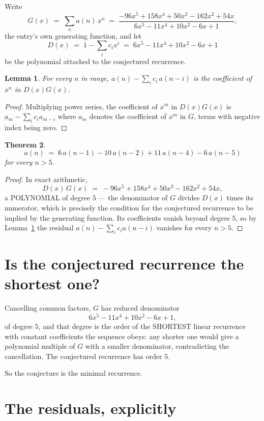 \documentclass[11pt,a4paper]{article}
\theoremstyle{plain}
\newtheorem{theorem}{Theorem}
\newtheorem{lemma}[theorem]{Lemma}
\theoremstyle{definition}
\begin{document}
Write
\[
G(x)\;=\;\sum_{n}a(n)\,x^{n}\;=\;\frac{- 96 x^{5} + 158 x^{4} + 50 x^{3} - 162 x^{2} + 54 x}{6 x^{5} - 11 x^{4} + 10 x^{2} - 6 x + 1},
\]
the entry's own generating function, and let
\[
D(x)\;=\;1-\sum_i c_i x^{i}\;=\;6 x^{5} - 11 x^{4} + 10 x^{2} - 6 x + 1
\]
be the polynomial attached to the conjectured recurrence.

\begin{lemma}\label{lem:key}
For every $n$ in range, $a(n)-\sum_i c_i\,a(n-i)$ is the coefficient of $x^{n}$ in
$D(x)G(x)$.
\end{lemma}

\begin{proof}
Multiplying power series, the coefficient of $x^{m}$ in $D(x)G(x)$ is
$a_m-\sum_i c_i a_{m-i}$ where $a_m$ denotes the coefficient of $x^{m}$ in $G$, terms with
negative index being zero.
\end{proof}

\begin{theorem}
\[
a(n)\;=\;6\,a(n-1) - 10\,a(n-2) + 11\,a(n-4) - 6\,a(n-5)
\]
for every $n>5$.
\end{theorem}

\begin{proof}
In exact arithmetic,
\[
D(x)\,G(x)\;=\;- 96 x^{5} + 158 x^{4} + 50 x^{3} - 162 x^{2} + 54 x,
\]
a POLYNOMIAL of degree $5$ --- the denominator of $G$ divides $D(x)$ times its numerator,
which is precisely the condition for the conjectured recurrence to be implied by the
generating function. Its coefficients vanish beyond degree $5$, so by
Lemma~\ref{lem:key} the residual $a(n)-\sum_ic_ia(n-i)$ vanishes for every
$n>5$.
\end{proof}

\section{Is the conjectured recurrence the shortest one?}

Cancelling common factors, $G$ has reduced denominator
\[
6 x^{5} - 11 x^{4} + 10 x^{2} - 6 x + 1,
\]
of degree $5$, and that degree is the order of the SHORTEST linear recurrence with
constant coefficients the sequence obeys: any shorter one would give a polynomial multiple of
$G$ with a smaller denominator, contradicting the cancellation. The conjectured recurrence has
order $5$.

So the conjecture is the minimal recurrence.

\section{The residuals, explicitly}
\end{document}
